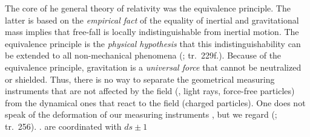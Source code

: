 \documentclass[draft]{article}
\newcommand{\FP}{\german{Fernparallelismus}\xspace}
\renewcommand{\rzlp}[2]{(\cite[#1]{Reichenbach1928}; tr.\ #2)\xspace}
\begin{document}
 

The core of he general theory of relativity was the equivalence principle. The latter is based on the \emph{empirical fact} of the equality of inertial and gravitational mass implies that free-fall is locally indistinguishable from inertial motion. The equivalence principle is the \emph{physical hypothesis} that this indistinguishability can be extended to all non-mechanical phenomena \rzlp{264}{229f.}. Because of the equivalence principle, gravitation is a \emph{universal force} that cannot be neutralized or shielded. Thus, there is no way to separate the geometrical measuring instruments that are not affected by the field (\rac, light rays, force-free particles) from the dynamical ones that react to the field (charged particles). One does not speak of the deformation of our measuring instruments , but we regard  \rzlp{294}{256}. . \Rac are coordinated with $ds\pm1$

\end{document}
